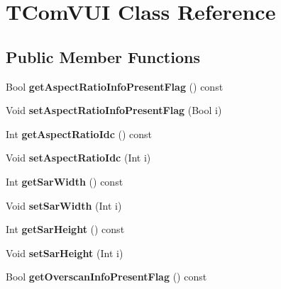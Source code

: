 \hypertarget{class_t_com_v_u_i}{}\section{T\+Com\+V\+UI Class Reference}
\label{class_t_com_v_u_i}
\subsection*{Public Member Functions}
\begin{DoxyCompactItemize}
\item 
\mbox{\label{class_t_com_v_u_i_aeda887c95594a8ad11d9a4db4ee61eda}} 
Bool {\bfseries get\+Aspect\+Ratio\+Info\+Present\+Flag} () const
\item 
\mbox{\label{class_t_com_v_u_i_aeb6ce659499d989bd181ef10e4b69b22}} 
Void {\bfseries set\+Aspect\+Ratio\+Info\+Present\+Flag} (Bool i)
\item 
\mbox{\label{class_t_com_v_u_i_a7048b0ecb4dffa67973536660e9319d3}} 
Int {\bfseries get\+Aspect\+Ratio\+Idc} () const
\item 
\mbox{\label{class_t_com_v_u_i_ac20561f8027ed4499b4e01ec98f10347}} 
Void {\bfseries set\+Aspect\+Ratio\+Idc} (Int i)
\item 
\mbox{\label{class_t_com_v_u_i_aeb7740cfb46798b22e06cffa7fd34556}} 
Int {\bfseries get\+Sar\+Width} () const
\item 
\mbox{\label{class_t_com_v_u_i_af14e74cf7f82cd1a44f403c5b2669b21}} 
Void {\bfseries set\+Sar\+Width} (Int i)
\item 
\mbox{\label{class_t_com_v_u_i_a861f5578f00b160a1b76b8e643f88368}} 
Int {\bfseries get\+Sar\+Height} () const
\item 
\mbox{\label{class_t_com_v_u_i_ae799b2413e44ea0e4db207125866a213}} 
Void {\bfseries set\+Sar\+Height} (Int i)
\item 
\mbox{\label{class_t_com_v_u_i_a5eeeae8453eeb853b220ede3ff326a9c}} 
Bool {\bfseries get\+Overscan\+Info\+Present\+Flag} () const

\end{DoxyCompactItemize}
